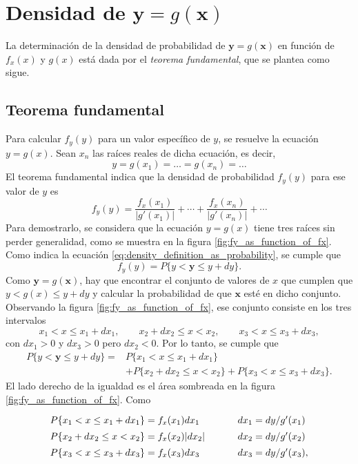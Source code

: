 \documentclass[a4paper]{report}
\newcommand{\x}{\mathbf{x}}
\newcommand{\y}{\mathbf{y}}
\begin{document}
\section{\texorpdfstring{Densidad de \(\y=g(\x)\)}{}}

La determinación de la densidad de probabilidad de \(\y=g(\x)\) en función de \(f_x(x)\) y \(g(x)\) está dada por el \emph{teorema fundamental}, que se plantea como sigue.

\subsection{Teorema fundamental}\label{sec:fundamental_theorem}

Para calcular \(f_y(y)\) para un valor específico de \(y\), se resuelve la ecuación \(y=g(x)\). Sean \(x_n\) las raíces reales de dicha ecuación, es decir,
\[
 y=g(x_1)=\dots=g(x_n)=\dots
\]
El teorema fundamental indica que la densidad de probabilidad \(f_y(y)\) para ese valor de \(y\) es
\begin{equation}\label{eq:functions_of_rv_fundamental_theorem}
 f_y(y)=\frac{f_x(x_1)}{\left|g'(x_1)\right|}+\cdots+\frac{f_x(x_n)}{\left|g'(x_n)\right|}+\cdots
\end{equation}
Para demostrarlo, se considera que la ecuación \(y=g(x)\) tiene tres raíces sin perder generalidad, como se muestra en la figura \ref{fig:fy_as_function_of_fx}. Como indica la ecuación \ref{eq:density_definition_as_probability}, se cumple que
\[
 f_y(y)=P\{y<\y\leq y+dy\}.
\]
Como \(\y=g(\x)\), hay que encontrar el conjunto de valores de \(x\) que cumplen que \(y<g(x)\leq y+dy\) y calcular la  probabilidad de que \(\x\) esté en dicho conjunto. Observando la figura \ref{fig:fy_as_function_of_fx}, ese conjunto consiste en los tres intervalos
\[
 x_1<x\leq x_1+dx_1,\qquad x_2+dx_2\leq x<x_2,\qquad x_3<x\leq x_3+dx_3, 
\]
con \(dx_1>0\) y \(dx_3>0\) pero \(dx_2<0\). Por lo tanto, se cumple que
\begin{align*}
 P\{y<\y\leq y+dy\}=&P\{x_1<x\leq x_1+dx_1\}\\
    &+P\{x_2+dx_2\leq x<x_2\}+P\{x_3<x\leq x_3+dx_3\}.
\end{align*}
El lado derecho de la igualdad es el área sombreada en la figura \ref{fig:fy_as_function_of_fx}. Como
\[\arraycolsep=1.4pt\def\arraystretch{1.4}
 \begin{array}{lllp{1cm}lll}
   P\{x_1<x\leq x_1+dx_1\}&=&f_x(x_1)dx_1&  &dx_1&=&dy/g'(x_1)\\
   P\{x_2+dx_2\leq x<x_2\}&=&f_x(x_2)|dx_2|&  &dx_2&=&dy/g'(x_2)\\
   P\{x_3<x\leq x_3+dx_3\}&=&f_x(x_3)dx_3&  &dx_3&=&dy/g'(x_3),
 \end{array}
\]
\end{document}

